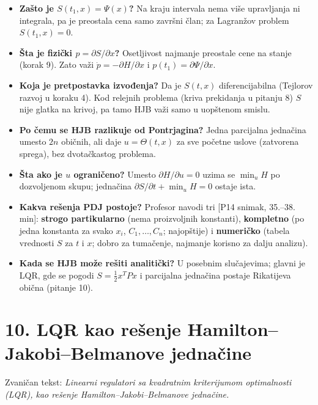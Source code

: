 \documentclass[11pt,a4paper,parskip=half,headsepline,numbers=noenddot]{scrartcl}
\DeclareRobustCommand{\izvor}[1]{{\small\color{izvorC}[#1]}}
\begin{document}
\begin{itemize}
\item \textbf{Zašto je \(S(t_1, x) = \Psi(x)\)?} Na kraju intervala nema više upravljanja ni integrala, pa je preostala cena samo završni član; za Lagranžov problem \(S(t_1, x) = 0\).
\item \textbf{Šta je fizički \(p = \partial S/\partial x\)?} Osetljivost najmanje preostale cene na stanje (korak 9). Zato važi \(\dot p = -\partial H/\partial x\) i \(p(t_1) = \partial\Psi/\partial x\).
\item \textbf{Koja je pretpostavka izvođenja?} Da je \(S(t, x)\) diferencijabilna (Tejlorov razvoj u koraku 4). Kod relejnih problema (kriva prekidanja u pitanju 8) \(S\) nije glatka na krivoj, pa tamo HJB važi samo u uopštenom smislu.
\item \textbf{Po čemu se HJB razlikuje od Pontrjagina?} Jedna parcijalna jednačina umesto \(2n\) običnih, ali daje \(u = \Theta(t, x)\) za sve početne uslove (zatvorena sprega), bez dvotačkastog problema.
\item \textbf{Šta ako je \(u\) ograničeno?} Umesto \(\partial H/\partial u = 0\) uzima se \(\min_u H\) po dozvoljenom skupu; jednačina \(\partial S/\partial t + \min_u H = 0\) ostaje ista.
\item \textbf{Kakva rešenja PDJ postoje?} Profesor navodi tri \izvor{P14 snimak, 35.--38. min}: \textbf{strogo partikularno} (nema proizvoljnih konstanti), \textbf{kompletno} (po jedna konstanta za svako \(x_i\), \(C_1, \dots, C_n\); najopštije) i \textbf{numeričko} (tabela vrednosti \(S\) za \(t\) i \(x\); dobro za tumačenje, najmanje korisno za dalju analizu).
\item \textbf{Kada se HJB može rešiti analitički?} U posebnim slučajevima; glavni je LQR, gde se pogodi \(S = \frac12x^TPx\) i parcijalna jednačina postaje Rikatijeva obična (pitanje 10).
\end{itemize}

\section{10. LQR kao rešenje Hamilton--Jakobi--Belmanove jednačine}

Zvaničan tekst: \emph{Linearni regulatori sa kvadratnim kriterijumom optimalnosti (LQR), kao rešenje Hamilton--Jakobi--Belmanove jednačine.}
\end{document}
